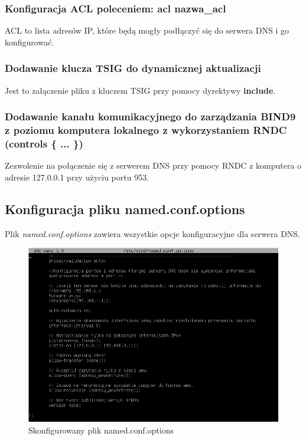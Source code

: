 \documentclass[12pt, a4paper]{article}
\begin{document}
        \subsubsection{Konfiguracja ACL poleceniem: acl nazwa\_acl}
            ACL to lista adresów IP, które będą mogły podłączyć się do serwera DNS i go konfigurować.
            
        \subsubsection{Dodawanie klucza TSIG do dynamicznej aktualizacji}
            Jest to załączenie pliku z kluczem TSIG przy pomocy dyrektywy \textbf{include}.
            
        \subsubsection{Dodawanie kanału komunikacyjnego do zarządzania BIND9 z poziomu komputera lokalnego z wykorzystaniem RNDC (controls \{ ... \})}
            Zezwolenie na połączenie się z serwerem DNS przy pomocy RNDC z komputera o adresie 127.0.0.1 przy użyciu portu 953.

    \subsection{Konfiguracja pliku named.conf.options}
    
        Plik \textit{named.conf.options} zawiera wszystkie opcje konfiguracyjne dla serwera DNS.
        \begin{figure}[h!]
            \centering
            \includegraphics[width=\textwidth]{named_conf_options.PNG}
            \caption{Skonfigurowany plik named.conf.options}
            \label{fig:conf_opt}
        \end{figure}
        
\end{document}
